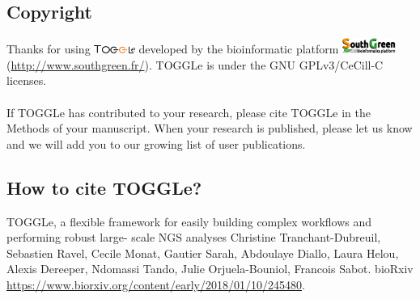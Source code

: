 \subsection{Copyright}

Thanks for using  \includegraphics[width=0.1\textwidth]{../img/toggleLogo2.png}  developed by the bioinformatic platform \includegraphics[width=0.13\textwidth]{../img/SGLogo.png} \cite{SouthGreen2016} (\url{http://www.southgreen.fr/}). TOGGLe is under the GNU GPLv3/CeCill-C licenses. 
\\
\\
If TOGGLe has contributed to your research, please cite TOGGLe in the Methods of your manuscript. When your research is published, please let us know and we will add you to our growing list of user publications.

\subsection{How to cite TOGGLe?}
TOGGLe, a flexible framework for easily building complex workflows and performing robust large- scale NGS analyses
Christine Tranchant-Dubreuil, Sebastien Ravel, Cecile Monat, Gautier Sarah, Abdoulaye Diallo, Laura Helou, Alexis Dereeper, Ndomassi Tando, Julie Orjuela-Bouniol, Francois Sabot. bioRxiv \url{https://www.biorxiv.org/content/early/2018/01/10/245480}.